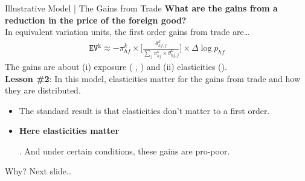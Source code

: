 \documentclass[9pt,pdftex,aspectratio=1610]{beamer}
\theoremstyle{definition}
\begin{document}

\begin{frame}[t]{Illustrative Model | The Gains from Trade}
\smallskip
\textbf{What are the gains from a reduction in the price of the foreign good?}\\
\bigskip
In equivalent variation units, the first order gains from trade are\ldots
\begin{align*}
\mathtt{EV^k} \approx -\pi_{hf}^k \times \bigg [ \frac{ \theta_{hf,f}^k }{ \sum\limits_{j} \pi_{hj}^k \times \theta_{hj,j}^k}  \bigg] \times \Delta\log{p}_{hf}
\end{align*}
The gains are about (i) exposure ( {\small \citet{deaton1989rice}, \citet{borusyak2021distributional} }) and (ii) elasticities ({\small \citet*{auer2022unequal}}).\\
\bigskip
\textbf{Lesson \#2}: In this model, elasticities matter for the gains from trade and how they are distributed.
\begin{itemize}
\smallskip
\item The standard result is that elasticities don't matter to a first order.
\smallskip
\item \begin{alert}{\textbf{Here elasticities matter}}\end{alert}. And under certain conditions, these gains are pro-poor.
\end{itemize}
\medskip
Why? Next slide\ldots
\end{frame}
\end{document}
